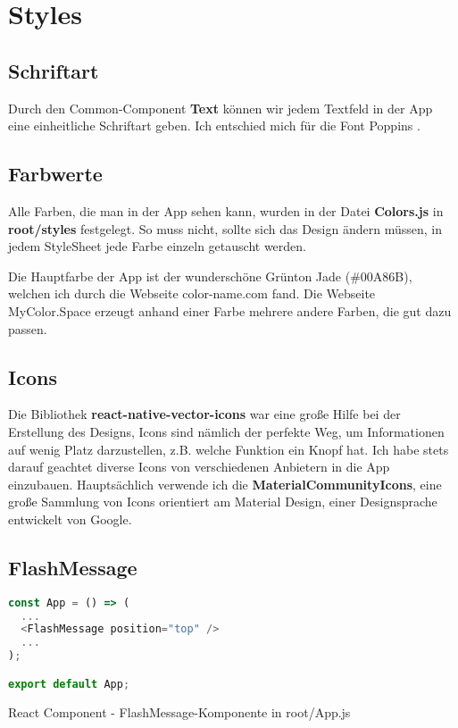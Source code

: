\section{Styles}
\subsection{Schriftart}
Durch den Common-Component \textbf{Text} können wir jedem Textfeld in der App eine einheitliche Schriftart
geben. Ich entschied mich für die Font Poppins \cite{poppins}.

\subsection{Farbwerte}
Alle Farben, die man in der App sehen kann, wurden in der Datei \textbf{Colors.js} in
\textbf{root/styles} festgelegt. So muss nicht, sollte sich das Design ändern müssen, in jedem
StyleSheet jede Farbe einzeln getauscht werden.

Die Hauptfarbe der App ist der wunderschöne Grünton Jade (\#00A86B), welchen ich durch die Webseite
color-name.com \cite{colorName} fand. Die Webseite MyColor.Space \cite{myColorSpace} erzeugt anhand
einer Farbe mehrere andere Farben, die gut dazu passen.

\subsection{Icons}
Die Bibliothek \textbf{react-native-vector-icons} \cite{reactNativeVectorIcons} war eine große Hilfe
bei der Erstellung des Designs, Icons sind nämlich der perfekte Weg, um Informationen auf wenig Platz
darzustellen, z.B. welche Funktion ein Knopf hat. Ich habe stets darauf geachtet diverse Icons von
verschiedenen Anbietern in die App einzubauen. Hauptsächlich verwende ich die
\textbf{MaterialCommunityIcons}, eine große Sammlung von Icons orientiert am Material Design, einer
Designsprache entwickelt von Google.

\newpage
\subsection{FlashMessage}
\begin{code}[htp]
\begin{lstlisting}[firstnumber=1,language=JavaScript, style=JSX]
const App = () => (
  ...
  <FlashMessage position="top" />
  ...
);

export default App;
\end{lstlisting}
\caption{React Component - FlashMessage-Komponente in root/App.js}
\end{code}

